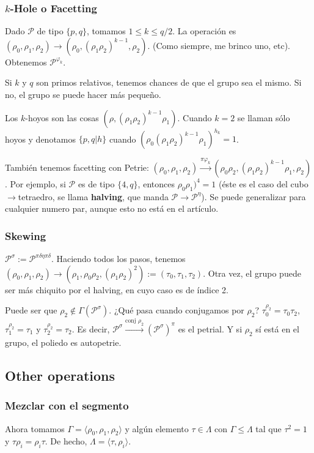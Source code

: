 \documentclass[spanish]{article}
\theoremstyle{definition}
\newcommand{\p}{\mathcal{P}}
\begin{document}
\subsubsection{$k$-Hole o Facetting}
Dado $\p$ de tipo $\{p,q\}$, tomamos $1\leq k\leq q/2$. La operación es $(\rho_0,\rho_1,\rho_2)\to(\rho_0,(\rho_1\rho_2)^{k-1},\rho_2)$. (Como siempre, me brinco uno, etc). Obtenemos $\p^{\varphi_k}$.

Si $k$ y $q$ son primos relativos, tenemos chances de que el grupo sea el mismo. Si no, el grupo se puede hacer más pequeño.

Los $k$-hoyos son las cosas $(\rho,(\rho_1\rho_2)^{k-1}\rho_1)$. Cuando $k=2$ se llaman sólo hoyos y denotamos $\{p,q|h\}$ cuando $(\rho_0(\rho_1\rho_2)^{k-1}\rho_1)^{h_k}=1$.

También tenemos facetting con Petrie: $(\rho_0,\rho_1,\rho_2)\xrightarrow{\pi\varphi_k}(\rho_0\rho_2,(\rho_1\rho_2)^{k-1}\rho_1,\rho_2)$. Por ejemplo, si $\p$ es de tipo $\{4,q\}$, entonces $\rho_0\rho_1)^4=1$ (éste es el caso del cubo$\to$tetraedro, se llama \textbf{halving}, que manda $\p\to\p^\eta$). Se puede generalizar para cualquier numero par, aunque esto no está en el artículo.

\subsubsection{Skewing}
$\p^\sigma:=\p^{\pi\delta\eta\pi\delta}$. Haciendo todos los pasos, tenemos $(\rho_0,\rho_1,\rho_2)\to(\rho_1,\rho_0\rho_2,(\rho_1\rho_2)^2):=(\tau_0,\tau_1,\tau_2)$. Otra vez, el grupo puede ser más chiquito por el halving, en cuyo caso es de índice 2.

Puede ser que $\rho_2\notin\Gamma(\p^\sigma)$. ¿Qué pasa cuando conjugamos por $\rho_2$? $\tau_0^{\rho_2}=\tau_0\tau_2$, $\tau_1^{\rho_2}=\tau_1$ y $\tau_2^{\rho_2}=\tau_2$. Es decir, $\p^\sigma\xrightarrow{\text{conj }\rho_2}(\p^\sigma)^\pi$ es el petrial. Y si $\rho_2$ sí está en el grupo, el poliedo es autopetrie.

\subsection{Other operations}
\subsubsection{Mezclar con el segmento}
Ahora tomamos $\Gamma=\langle\rho_0,\rho_1,\rho_2\rangle$ y algún elemento $\tau\in\Lambda$ con $\Gamma\leq\Lambda$ tal que $\tau^2=1$ y $\tau\rho_i=\rho_i\tau$. De hecho, $\Lambda=\langle\tau,\rho_i\rangle$.
\end{document}
